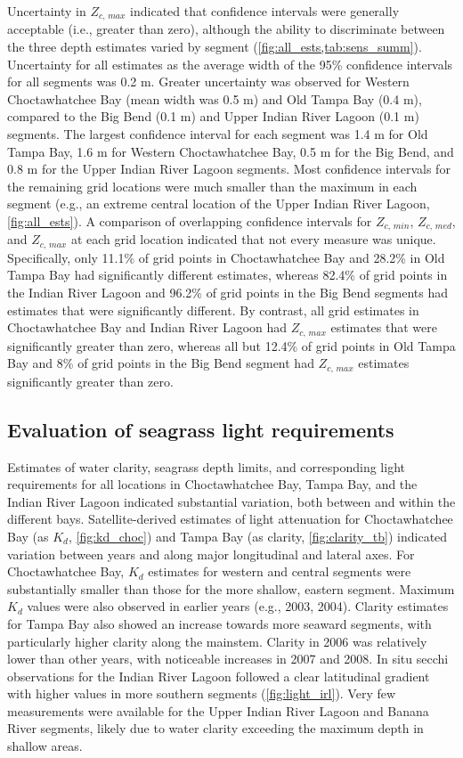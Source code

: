 \documentclass[letterpaper,12pt,oneside]{article}\usepackage[]{graphicx}\usepackage[]{color}
\begin{document}
Uncertainty in $Z_{c,\,max}$ indicated that confidence intervals were generally acceptable (i.e., greater than zero), although the ability to discriminate between the three depth estimates varied by segment (\cref{fig:all_ests,tab:sens_summ}). Uncertainty for all estimates as the average width of the 95\% confidence intervals for all segments was 0.2 m.  Greater uncertainty was observed for Western Choctawhatchee Bay (mean width was 0.5 m) and Old Tampa Bay (0.4 m), compared to the Big Bend (0.1 m) and Upper Indian River Lagoon (0.1 m) segments.  The largest confidence interval for each segment was 1.4 m for Old Tampa Bay, 1.6 m for Western Choctawhatchee Bay, 0.5 m for the Big Bend, and 0.8 m for the Upper Indian River Lagoon segments.  Most confidence intervals for the remaining grid locations were much smaller than the maximum in each segment (e.g., an extreme central location of the Upper Indian River Lagoon, \cref{fig:all_ests}).  A comparison of overlapping confidence intervals for $Z_{c,\,min}$, $Z_{c,\,med}$, and $Z_{c,\,max}$ at each grid location indicated that not every measure was unique.  Specifically, only 11.1\% of grid points in Choctawhatchee Bay and 28.2\% in Old Tampa Bay had significantly different estimates, whereas 82.4\% of grid points in the Indian River Lagoon and 96.2\% of grid points in the Big Bend segments had estimates that were significantly different.  By contrast, all grid estimates in Choctawhatchee Bay and Indian River Lagoon had $Z_{c,\,max}$ estimates that were significantly greater than zero, whereas all but 12.4\% of grid points in Old Tampa Bay and 8\% of grid points in the Big Bend segment had $Z_{c,\,max}$ estimates significantly greater than zero. 

\subsection{Evaluation of seagrass light requirements}

Estimates of water clarity, seagrass depth limits, and corresponding light requirements for all locations in Choctawhatchee Bay, Tampa Bay, and the Indian River Lagoon indicated substantial variation, both between and within the different bays.  Satellite-derived estimates of light attenuation for Choctawhatchee Bay (as $K_d$, \cref{fig:kd_choc}) and Tampa Bay (as clarity, \cref{fig:clarity_tb}) indicated variation between years and along major longitudinal and lateral axes.  For Choctawhatchee Bay, $K_d$ estimates for western and central segments were substantially smaller than those for the more shallow, eastern segment.  Maximum $K_d$ values were also observed in earlier years (e.g., 2003, 2004).  Clarity estimates for Tampa Bay also showed an increase towards more seaward segments, with particularly higher clarity along the mainstem.  Clarity in 2006 was relatively lower than other years, with noticeable increases in 2007 and 2008.  In situ secchi observations for the Indian River Lagoon followed a clear latitudinal gradient with higher values in more southern segments (\cref{fig:light_irl}).  Very few measurements were available for the Upper Indian River Lagoon and Banana River segments, likely due to water clarity exceeding the maximum depth in shallow areas.
\end{document}
